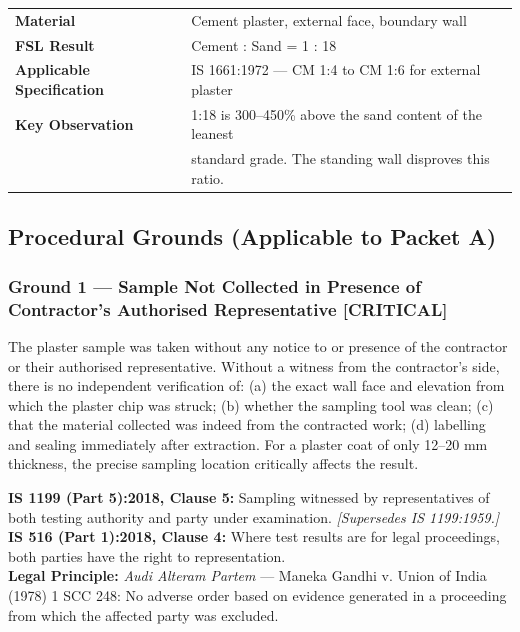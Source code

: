 \documentclass[12pt, a4paper]{article}
\begin{document}
\begin{center}
\begin{tabular}{|l|l|}
  \hline
  \textbf{Material} & Cement plaster, external face, boundary wall \\
  \textbf{FSL Result} & Cement : Sand = 1 : 18 \\
  \textbf{Applicable Specification} & IS 1661:1972 --- CM 1:4 to CM 1:6 for external plaster \\
  \textbf{Key Observation} & 1:18 is 300--450\% above the sand content of the leanest \\
                           & standard grade. The standing wall disproves this ratio. \\
  \hline
\end{tabular}
\end{center}


\subsection{Procedural Grounds (Applicable to Packet A)}

\subsubsection{Ground 1 --- Sample Not Collected in Presence of Contractor's Authorised Representative \textbf{[CRITICAL]}}

\begin{groundbox}
The plaster sample was taken without any notice to or presence of the contractor or their authorised representative. Without a witness from the contractor's side, there is no independent verification of: (a) the exact wall face and elevation from which the plaster chip was struck; (b) whether the sampling tool was clean; (c) that the material collected was indeed from the contracted work; (d) labelling and sealing immediately after extraction. For a plaster coat of only 12--20 mm thickness, the precise sampling location critically affects the result.
\end{groundbox}

\begin{standardbox}
\textbf{IS 1199 (Part 5):2018, Clause 5:} Sampling witnessed by representatives of both testing authority and party under examination. \textit{[Supersedes IS 1199:1959.]}\\
\textbf{IS 516 (Part 1):2018, Clause 4:} Where test results are for legal proceedings, both parties have the right to representation.\\
\textbf{Legal Principle:} \textit{Audi Alteram Partem} --- Maneka Gandhi v. Union of India (1978) 1 SCC 248: No adverse order based on evidence generated in a proceeding from which the affected party was excluded.
\end{standardbox}
\end{document}

